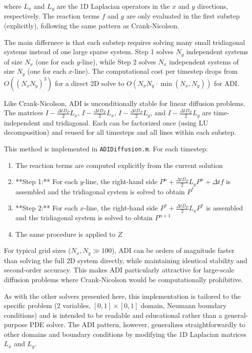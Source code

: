 \documentclass[11pt,oneside,parskip=half]{scrbook}  %
\begin{document}
where $L_x$ and $L_y$ are the 1D Laplacian operators in the $x$ and $y$ directions, respectively. The reaction terms $f$ and $g$ are only evaluated in the first substep (explicitly), following the same pattern as Crank-Nicolson.

The main differnece is that each substep requires solving many small tridiagonal systems instead of one large sparse system. Step 1 solves $N_y$ independent systems of size $N_x$ (one for each $y$-line), while Step 2 solves $N_x$ independent systems of size $N_y$ (one for each $x$-line). The computational cost per timestep drops from $O((N_x N_y)^3)$ for a direct 2D solve to $O(N_x N_y \cdot \min(N_x, N_y))$ for ADI.

Like Crank-Nicolson, ADI is unconditionally stable for linear diffusion problems. The matrices $I-\frac{\Delta t D_P}{2}L_x$, $I-\frac{\Delta t D_Z}{2}L_x$, $I-\frac{\Delta t D_P}{2}L_y$, and $I-\frac{\Delta t D_Z}{2}L_y$ are time-independent and tridiagonal. Each can be factorized once (using LU decomposition) and reused for all timesteps and all lines within each substep.

This method is implemented in \texttt{ADIDiffusion.m}. For each timestep:

\begin{enumerate}
\item{The reaction terms are computed explicitly from the current solution}
\item{**Step 1:** For each $y$-line, the right-hand side $P^n + \frac{\Delta t D_P}{2}L_y P^n + \Delta t f$ is assembled and the tridiagonal system is solved to obtain $P^*$}
\item{**Step 2:** For each $x$-line, the right-hand side $P^* + \frac{\Delta t D_P}{2}L_x P^*$ is assembled and the tridiagonal system is solved to obtain $P^{n+1}$}
\item{The same procedure is applied to $Z$}
\end{enumerate}

For typical grid sizes ($N_x, N_y \gg 100$), ADI can be orders of magnitude faster than solving the full 2D system directly, while maintaining identical stability and second-order accuracy. This makes ADI particularly attractive for large-scale diffusion problems where Crank-Nicolson would be computationally prohibitive.

As with the other solvers presented here, this implementation is tailored to the specific problem (2 variables, $[0,1]\times[0,1]$ domain, Neumann boundary conditions) and is intended to be readable and educational rather than a general-purpose PDE solver. The ADI pattern, however, generalizes straightforwardly to other domains and boundary conditions by modifying the 1D Laplacian matrices $L_x$ and $L_y$.
\end{document}
